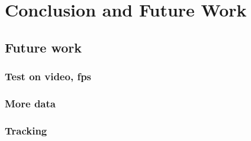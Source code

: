 \chapter{Conclusion and Future Work}

\section{Future work}
\subsection{Test on video, fps}
\subsection{More data}
\subsection{Tracking}